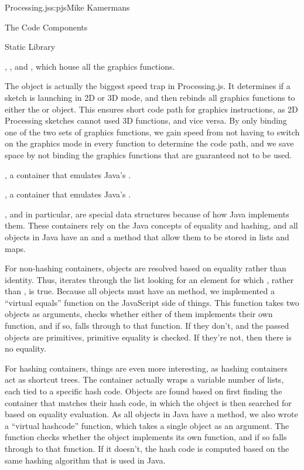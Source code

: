 \begin{aosachapter}{Processing.js}{s:pjs}{Mike Kamermans}
\begin{aosasect1}{The Code Components}
\begin{aosasect2}{Static Library}
\begin{aosaitemize}
\item {}, , and , which house all the
  graphics functions.

The  object is actually the biggest speed trap in
Processing.js. It determines if a sketch is
launching in 2D or 3D mode, and then rebinds all graphics functions
to either the  or  object. This ensures short code
path for graphics instructions, as 2D Processing sketches cannot used
3D functions, and vice versa. By only binding one of the two sets of
graphics functions, we gain speed from not having to switch on the
graphics mode in every function to determine the code path, and we
save space by not binding the graphics functions that are guaranteed
not to be used.

\item {}, a container that emulates Java's .

\item {}, a container that emulates Java's .

, and  in particular, are special data structures
because of how Java implements them. These containers rely on the Java
concepts of equality and hashing, and all objects in Java have an
 and a  method that allow them to be
stored in lists and maps.

For non-hashing containers, objects are resolved based on equality
rather than identity. Thus,  iterates through the
list looking for an element for which , rather
than , is true. Because all objects must have an
 method, we implemented a ``virtual equals'' function on
the JavaScript side of things. This function takes two objects as
arguments, checks whether either of them implements their own
 function, and if so, falls through to that function.
If they don't, and the passed objects are primitives,
primitive equality is checked. If they're not, then there is no
equality.

For hashing containers, things are even more interesting, as hashing
containers act as shortcut trees. The container actually wraps a
variable number of lists, each tied to a specific hash code. Objects
are found based on first finding the container that matches their hash
code, in which the object is then searched for based on equality
evaluation. As all objects in Java have a  method, we also
wrote a ``virtual hashcode'' function, which takes a single object as
an argument. The function checks whether the object implements its own
 function, and if so falls through to that function.
If it doesn't, the hash code is computed based on the same
hashing algorithm that is used in Java.


\end{aosaitemize}
\end{aosasect2}
\end{aosasect1}
\end{aosachapter}
